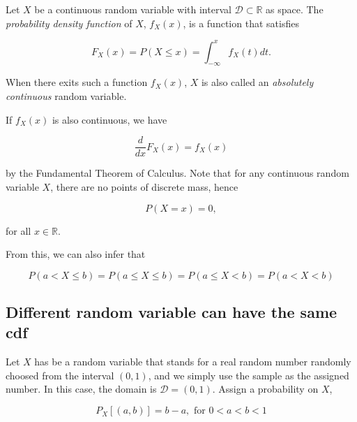 \documentclass{article}
\begin{document}
            Let $ X $ be a continuous random variable with interval $
            \mathcal{D} \subset \mathbb{R} $ as space. The \textit{probability
            density function} of $ X $, $ f_{X}(x) $, is a function that
            satisfies

            \begin{equation*}
                F_{X}(x) = P(X \leq x) = \int_{-\infty}^{x} f_{X}(t) dt.
            \end{equation*}

            When there exits such a function $ f_{X}(x) $, $ X $ is also called an
            \textit{absolutely continuous} random variable.

            If $ f_{X}(x) $ is also continuous, we have

            \begin{equation*}
                 \frac{d}{dx} F_{X}(x) = f_{X}(x)
            \end{equation*}

            by the Fundamental Theorem of Calculus. Note that for any continuous
            random variable $ X $, there are no points of discrete mass, hence

            \begin{equation*}
                 P(X = x) = 0,
            \end{equation*}

            for all $ x \in \mathbb{R} $.

            From this, we can also infer that

            \begin{equation*}
                 P ( a < X \leq b ) = P ( a \leq X \leq b) = P ( a \leq X < b)
                     = P ( a < X < b)
            \end{equation*}

        \subsection{Different random variable can have the same cdf}

            Let $ X $ has be a random variable that stands for a real
            random number randomly choosed from the interval $ (0, 1) $,
            and we simply use the sample as the assigned number. In this case,
            the domain is $ \mathcal{D} = (0, 1) $. Assign a probability on $ X $,

            \begin{equation*}
                P_{X}[(a, b)] = b - a, \text{ for } 0 < a < b < 1
            \end{equation*}
\end{document}
